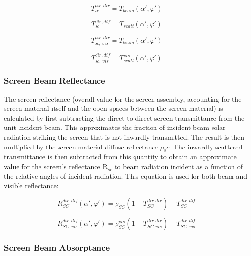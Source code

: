 \begin{equation}
T_{sc}^{dir,dir} = {T_{beam}}\left( {\alpha ',\varphi '} \right)
\end{equation}

\begin{equation}
T_{sc}^{dir,dif} = {T_{scatt}}\left( {\alpha ',\varphi '} \right)
\end{equation}

\begin{equation}
T_{sc,\,vis}^{dir,dir} = {T_{beam}}\left( {\alpha ',\varphi '} \right)
\end{equation}

\begin{equation}
T_{sc,\,vis}^{dir,dif} = T_{scatt}^{vis}\left( {\alpha ',\varphi '} \right)
\end{equation}

\subsubsection{Screen Beam Reflectance}\label{screen-beam-reflectance}

The screen reflectance (overall value for the screen assembly, accounting for the screen material itself and the open spaces between the screen material) is calculated by first subtracting the direct-to-direct screen transmittance from the unit incident beam. This approximates the fraction of incident beam solar radiation striking the screen that is not inwardly transmitted. The result is then multiplied by the screen material diffuse reflectance \(\rho_sc\). The inwardly scattered transmittance is then subtracted from this quantity to obtain an approximate value for the screen's reflectance R\(_{sc}\) to beam radiation incident as a function of the relative angles of incident radiation. This equation is used for both beam and visible reflectance:

\begin{equation}
R_{SC}^{dir,dif}\left( {\alpha ',\varphi '} \right) = {\rho_{SC}}\left( {1 - T_{SC}^{dir,dir}} \right) - T_{SC}^{dir,dif}
\end{equation}

\begin{equation}
R_{SC,vis}^{dir,dif}\left( {\alpha ',\varphi '} \right) = \rho_{SC}^{vis}\left( {1 - T_{SC,vis}^{dir,dir}} \right) - T_{SC,vis}^{dir,dif}
\end{equation}

\subsubsection{Screen Beam Absorptance}\label{screen-beam-absorptance}

